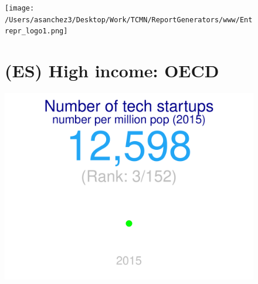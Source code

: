 \documentclass{article}\usepackage[]{graphicx}\usepackage[]{color}
\makeatletter
\def\maxwidth{ %
  \ifdim\Gin@nat@width>\linewidth
    \linewidth
  \else
    \Gin@nat@width
  \fi
}
\makeatother
\begin{document}
\begin{figure}
\begin{minipage}[t]{0.99\textwidth} %
  \vspace*{-26cm}
  \begin{minipage}[t]{0.48\textwidth} %
    \vspace{-1ex}
    \begin{minipage}[t]{0.99\textwidth} %
      \texttt{[image: /Users/asanchez3/Desktop/Work/TCMN/ReportGenerators/www/Entrepr\_logo1.png]}
    \end{minipage}
  
    \begin{minipage}[b]{0.99\textwidth} 
      \vspace{5ex}
      \begin{minipage}[c]{0.18\textwidth} %
      \end{minipage}
      \begin{minipage}[c]{0.80\textwidth} %
        \section*{\color{blue!40!black}(ES) High income: OECD}
      \end{minipage}
    \end{minipage}
  \end{minipage}
  \begin{minipage}[t]{0.55\textwidth} %
    \vspace{1ex}
    \begin{minipage}[c]{0.30\textwidth}


\hfill{}\includegraphics[width=\maxwidth]{figure/figure_sparkline1-1} 




\end{minipage}
\end{minipage}
\end{minipage}
\end{figure}
\end{document}
